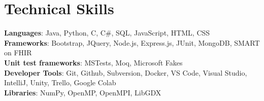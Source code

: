 \documentclass[letterpaper,11pt]{article}
\begin{document}
%
\section{Technical Skills}
 \begin{itemize}[leftmargin=0.15in, label={}]
    \small{\item{
     \textbf{Languages}{: Java, Python, C, C\#, SQL, JavaScript, HTML, CSS} \\
     \textbf{Frameworks}{: Bootstrap, JQuery, Node.js, Express.js, JUnit, MongoDB, SMART on FHIR} \\
     \textbf{Unit test frameworks}{: MSTests, Moq, Microsoft Fakes} \\
     \textbf{Developer Tools}{: Git, Github, Subversion, Docker, VS Code, Visual Studio, IntelliJ, Unity, Trello, Google Colab} \\
     \textbf{Libraries}{: NumPy, OpenMP, OpenMPI, LibGDX}
    }}
 \end{itemize}


\end{document}
